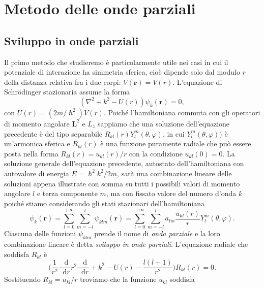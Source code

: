\documentclass[a4paper,fleqn,twoside,12pt]{article}
\renewcommand{\phi}{\varphi}
\newcommand*{\dd}{\mathop{}\!\mathrm{d}} %
\newcommand*{\toder}[3][]{\frac{{\dd^{#1}}#2}{\dd {#3}^{#1}}}
\begin{document}
\section{Metodo delle onde parziali}
\label{sec:onde-parziali}

\subsection{Sviluppo in onde parziali}
\label{sec:sviluppo-onde}

Il primo metodo che studieremo è particolarmente utile nei casi in cui il
potenziale di interazione ha simmetria sferica, cioè dipende solo dal modulo $r$
della distanza relativa fra i due corpi: $V(\bm{r}) = V(r)$.  L'equazione di
Schrödinger stazionaria assume la forma
\begin{equation}
  (\nabla^{2} + k^{2} - U(r)) \psi_{k}(\bm{r}) = 0,
\end{equation}
con $U(r) = (2m/\hslash^{2})V(r)$.  Poiché l'hamiltoniana commuta con gli
operatori di momento angolare $\bm{L}^{2}$ e $L_{z}$ sappiamo che una soluzione
dell'equazione precedente è del tipo separabile
$R_{kl}(r)Y_{l}^{m}(\theta,\phi)$, in cui $Y_{l}^{m}(\theta,\phi))$ è
un'armonica sferica e $R_{kl}(r)$ è una funzione puramente radiale che può
essere posta nella forma $R_{kl}(r) = u_{kl}(r)/r$ con la condizione
$u_{kl}(0) = 0$.  La soluzione generale dell'equazione precedente, autostato
dell'hamiltoniana con autovalore di energia $E = \hslash^{2}k^{2}/2m$, sarà una
combinazione lineare delle soluzioni appena illustrate con somma su tutti i
possibili valori di momento angolare $l$ e terza componente $m$, ma con fissato
valore del numero d'onda $k$ poiché stiamo considerando gli stati stazionari
dell'hamiltoniana
\begin{equation}
  \label{eq:onde-parziali1}
  \psi_{k}(\bm{r}) = \sum_{l = 0}^{+\infty} \sum_{m = -l}^{l} \psi_{klm}(\bm{r})
  = \sum_{l = 0}^{+\infty} \sum_{m = -l}^{l} a_{lm}
  \frac{u_{kl}(r)}{r}Y_{l}^{m}(\theta,\phi).
\end{equation}
Ciascuna delle funzioni $\psi_{klm}$ prende il nome di \emph{onda parziale} e la
loro combinazione lineare è detta \emph{sviluppo in onde parziali}.  L'equazione
radiale che soddisfa $R_{kl}$ è
\begin{equation}
  \label{eq:diff-R-op}
  \bigg(\frac{1}{r^{2}}\toder{}{r}r^{2}\toder{}{r} + k^{2} - U(r) -
  \frac{l(l+1)}{r^{2}}\bigg)R_{kl}(r) = 0.
\end{equation}
Sostituendo $R_{kl}=u_{kl}/r$ troviamo che la funzione $u_{kl}$ soddisfa
\end{document}

